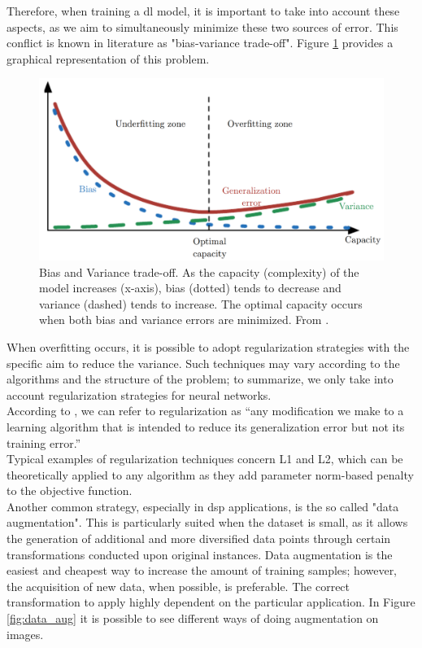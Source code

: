 Therefore, when training a \gls{dl} model, it is important to take into account these aspects, as we aim to simultaneously minimize these two sources of error. This conflict is known in literature as "bias-variance trade-off". Figure \ref{fig:underoverfitting} provides a graphical representation of this problem. \\
\begin{figure}[H]
	\begin{center}
		\includegraphics[scale=.4]{img/underoverfitting.png}
		\captionsetup{margin=2cm}
		\caption{Bias and Variance trade-off. As the capacity (complexity) of the model increases (x-axis), bias (dotted) tends to decrease and variance (dashed) tends to increase. The optimal capacity occurs when both bias and variance errors are minimized. From \cite{goodfellow2016deep}.}
		\label{fig:underoverfitting}
	\end{center}
\end{figure}
\noindent When overfitting occurs, it is possible to adopt regularization strategies with the specific aim to reduce the variance. Such techniques may vary according to the algorithms and the structure of the problem; to summarize, we only take into account regularization strategies for neural networks. \\
According to \cite{goodfellow2016deep}, we can refer to regularization as “any modification we make to a learning algorithm that is intended to reduce its generalization error but not its training error.”  \\
Typical examples of regularization techniques concern L1 and L2, which can be theoretically applied to any algorithm as they add parameter norm-based penalty to the objective function. \\
Another common strategy, especially in \gls{dsp} applications, is the so called "data augmentation". This is particularly suited when the dataset is small, as it allows the generation of additional and more diversified data points through certain transformations conducted upon original instances. Data augmentation is the easiest and cheapest way to increase the amount of training samples; however, the acquisition of new data, when possible, is preferable.  The correct transformation to apply highly dependent on the particular application. In Figure \ref{fig:data_aug} it is possible to see different ways of doing augmentation on images. \\
